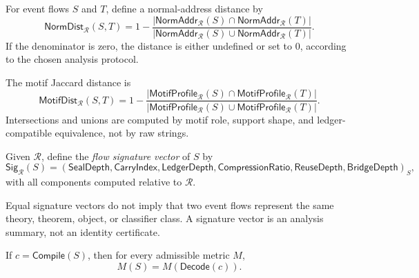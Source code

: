 \begin{definition}
\label{def:metrics-normal-address-distance}
For event flows $S$ and $T$, define a normal-address distance by
$$
  \mathsf{NormDist}_{\mathcal R}(S,T)
  =
  1-
  \frac{
    |\mathsf{NormAddr}_{\mathcal R}(S)\cap\mathsf{NormAddr}_{\mathcal R}(T)|
  }{
    |\mathsf{NormAddr}_{\mathcal R}(S)\cup\mathsf{NormAddr}_{\mathcal R}(T)|
  }.
$$
If the denominator is zero, the distance is either undefined or set to $0$, according to the chosen analysis protocol.
\end{definition}

\begin{definition}
\label{def:metrics-motif-jaccard-distance}
The motif Jaccard distance is
$$
  \mathsf{MotifDist}_{\mathcal R}(S,T)
  =
  1-
  \frac{
    |\mathsf{MotifProfile}_{\mathcal R}(S)\cap\mathsf{MotifProfile}_{\mathcal R}(T)|
  }{
    |\mathsf{MotifProfile}_{\mathcal R}(S)\cup\mathsf{MotifProfile}_{\mathcal R}(T)|
  }.
$$
Intersections and unions are computed by motif role, support shape, and ledger-compatible equivalence, not by raw strings.
\end{definition}

\begin{definition}
\label{def:metrics-flow-signature}
Given $\mathcal R$, define the \emph{flow signature vector} of $S$ by
$$
  \mathsf{Sig}_{\mathcal R}(S)
  =
  (
  \mathsf{SealDepth},
  \mathsf{CarryIndex},
  \mathsf{LedgerDepth},
  \mathsf{CompressionRatio},
  \mathsf{ReuseDepth},
  \mathsf{BridgeDepth}
  )_S,
$$
with all components computed relative to $\mathcal R$.
\end{definition}

\begin{remark}
\label{rem:metrics-signature-not-identity}
Equal signature vectors do not imply that two event flows represent the same theory, theorem, object, or classifier class. A signature vector is an analysis summary, not an identity certificate.
\end{remark}

\begin{theorem}
\label{thm:metrics-channel-roundtrip-invariant}
If $c=\mathsf{Compile}(S)$, then for every admissible metric $M$,
$$
  M(S)=M(\mathsf{Decode}(c)).
$$
\end{theorem}

